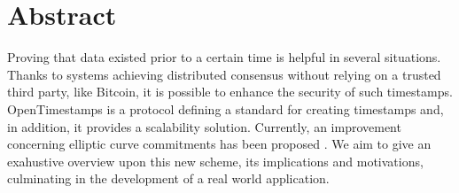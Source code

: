 \chapter{Abstract}
\label{chpr:abstract}

Proving that data existed prior to a certain time is helpful in several situations.
Thanks to systems achieving distributed consensus without relying on a trusted third party, like Bitcoin, it is possible to enhance the security of such timestamps.
OpenTimestamps is a protocol defining a standard for creating timestamps and, in addition, it provides a scalability solution.
Currently, an improvement concerning elliptic curve commitments has been proposed \cite{PoePR}. 
We aim to give an exahustive overview upon this new scheme, its implications and motivations, culminating in the development of a real world application.

